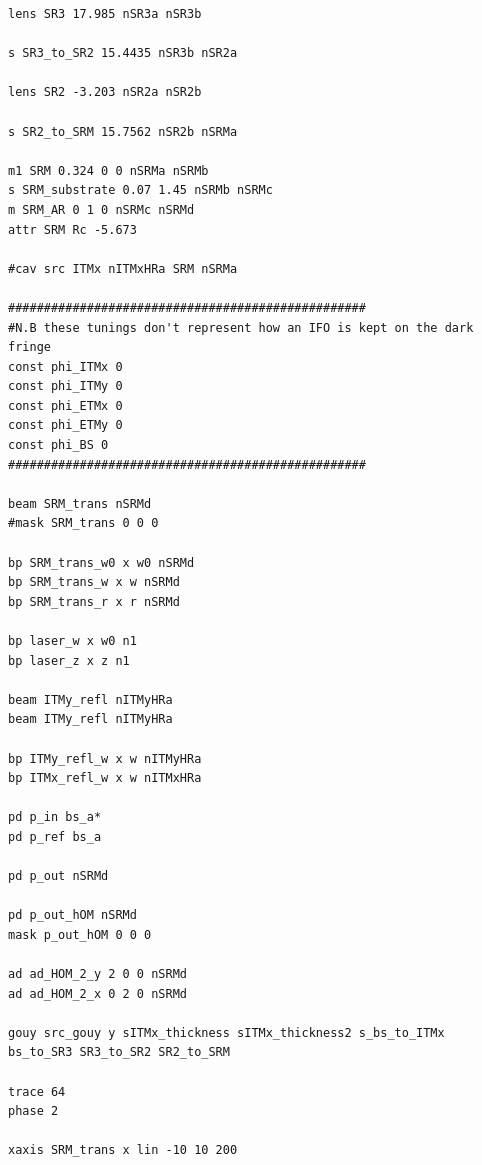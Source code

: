 \begin{lstlisting}[breaklines]
lens SR3 17.985 nSR3a nSR3b  

s SR3_to_SR2 15.4435 nSR3b nSR2a

lens SR2 -3.203 nSR2a nSR2b

s SR2_to_SRM 15.7562 nSR2b nSRMa

m1 SRM 0.324 0 0 nSRMa nSRMb
s SRM_substrate 0.07 1.45 nSRMb nSRMc
m SRM_AR 0 1 0 nSRMc nSRMd
attr SRM Rc -5.673

#cav src ITMx nITMxHRa SRM nSRMa

##################################################
#N.B these tunings don't represent how an IFO is kept on the dark fringe
const phi_ITMx 0 
const phi_ITMy 0
const phi_ETMx 0 
const phi_ETMy 0
const phi_BS 0  
##################################################

beam SRM_trans nSRMd
#mask SRM_trans 0 0 0

bp SRM_trans_w0 x w0 nSRMd
bp SRM_trans_w x w nSRMd
bp SRM_trans_r x r nSRMd

bp laser_w x w0 n1
bp laser_z x z n1

beam ITMy_refl nITMyHRa
beam ITMy_refl nITMyHRa

bp ITMy_refl_w x w nITMyHRa
bp ITMx_refl_w x w nITMxHRa

pd p_in bs_a*
pd p_ref bs_a

pd p_out nSRMd

pd p_out_hOM nSRMd
mask p_out_hOM 0 0 0

ad ad_HOM_2_y 2 0 0 nSRMd
ad ad_HOM_2_x 0 2 0 nSRMd

gouy src_gouy y sITMx_thickness sITMx_thickness2 s_bs_to_ITMx bs_to_SR3 SR3_to_SR2 SR2_to_SRM

trace 64
phase 2

xaxis SRM_trans x lin -10 10 200 
\end{lstlisting}


